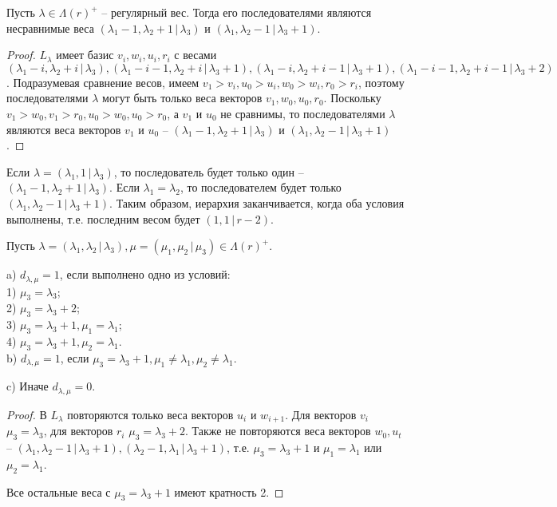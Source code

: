 \begin{lemma}
Пусть $ \lambda \in \Lambda(r)^+ $ -- регулярный вес. Тогда его последователями являются несравнимые веса
$ (\lambda_1 - 1, \lambda_2 + 1 \,|\, \lambda_3) $ и $ (\lambda_1, \lambda_2 - 1 \,|\, \lambda_3 + 1) $.
\end{lemma}
\begin{proof}
$ L_{\lambda} $ имеет базис $ v_i, w_i, u_i, r_i $ с весами 
$ (\lambda_1 - i, \lambda_2 + i \,|\, \lambda_3), (\lambda_1 - i - 1, \lambda_2 + i \,|\, \lambda_3 + 1), 
(\lambda_1 - i, \lambda_2 + i - 1 \,|\, \lambda_3 + 1), (\lambda_1 - i - 1, \lambda_2 + i - 1 \,|\, \lambda_3 + 2) $.
Подразумевая сравнение весов, имеем $ v_1 > v_i, u_0 > u_i, w_0 > w_i, r_0 > r_i $, поэтому последователями $ \lambda $ 
могут быть только веса векторов $ v_1, w_0, u_0, r_0 $. 
Поскольку $ v_1 > w_0, v_1 > r_0, u_0 > w_0, u_0 > r_0 $, а $ v_1 $ и $ u_0 $ не сравнимы, то 
последователями $ \lambda $ являются веса векторов $ v_1 $ и $ u_0 $ -- 
$ (\lambda_1 - 1, \lambda_2 + 1 \,|\, \lambda_3) $ и $ (\lambda_1, \lambda_2 - 1 \,|\, \lambda_3 + 1) $.
\end{proof}
%
\begin{remark}
Если $ \lambda = (\lambda_1, 1 \,|\, \lambda_3) $, то последователь будет только один -- \\
$ (\lambda_1 - 1, \lambda_2 + 1 \,|\, \lambda_3) $.
Если $ \lambda_1 = \lambda_2 $, то последователем будет только $ (\lambda_1, \lambda_2 - 1 \,|\, \lambda_3 + 1) $.
Таким образом, иерархия заканчивается, когда оба условия выполнены, т.е. последним весом будет $ (1, 1 \,|\, r - 2) $.
\end{remark}
%
\begin{lemma}
Пусть $ \lambda = (\lambda_1, \lambda_2 \,|\, \lambda_3), \mu = (\mu_1, \mu_2 \,|\, \mu_3) \in \Lambda(r)^+ $.

a) $ d_{\lambda, \mu} = 1 $, если выполнено одно из условий: \\
1) $ \mu_3 = \lambda_3 $; \\
2) $ \mu_3 = \lambda_3 + 2 $; \\
3) $ \mu_3 = \lambda_3 + 1, \mu_1 = \lambda_1 $; \\
4) $ \mu_3 = \lambda_3 + 1, \mu_2 = \lambda_1 $. \\

b) $ d_{\lambda, \mu} = 1 $, если $ \mu_3 = \lambda_3 + 1, \mu_1 \neq \lambda_1, \mu_2 \neq \lambda_1 $.

c) Иначе $ d_{\lambda, \mu} = 0 $.
\end{lemma}
\begin{proof}
В $ L_{\lambda} $ повторяются только веса векторов $ u_i $ и $ w_{i + 1} $.
Для векторов $ v_i $ $ \mu_3 = \lambda_3 $, для векторов $ r_i $ $ \mu_3 = \lambda_3 + 2 $. 
Также не повторяются веса векторов $ w_0, u_t $ -- $ (\lambda_1, \lambda_2 - 1 \,|\, \lambda_3 + 1), (\lambda_2 - 1, \lambda_1 \,|\, \lambda_3 + 1) $,
т.е. $ \mu_3 = \lambda_3 + 1 $ и $ \mu_1 = \lambda_1 $ или $ \mu_2 = \lambda_1 $.

Все остальные веса с $ \mu_3 = \lambda_3 + 1 $ имеют кратность 2.
\end{proof}
